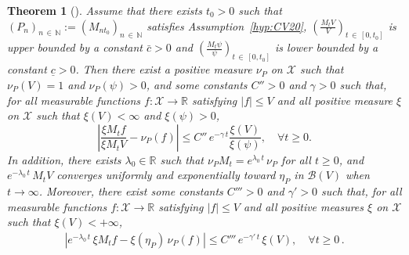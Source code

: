 \documentclass[10pt]{amsart}
\newtheorem{theo}{Theorem}[section]
\theoremstyle{definition}\newtheorem{defi}[theo]{Definition}\newtheorem{rema}[theo]{Remark}\newtheorem{exam}[theo]{Example}\newtheorem{exem}[theo]{Example}\newtheorem{nota}[theo]{Notation}
\newcommand{\RR}{\mathbb{R}}
\newcommand{\NN}{\mathbb{N}}
\newcommand{\clX}{\mathcal{X}}
\newcommand{\clB}{\mathcal{B}}
\newcommand{\1}{\mathbf{1}}
\let\oldforall\forall
\renewcommand*{\forall}{\mathrel{\oldforall}}
\begin{document}
\begin{theo}[{\cite[Corollary~2.4]{CV20}}]\label{th:CV20}
Assume that there exists $t_0>0$ such that $(P_{n})_{n\,\in\,\NN}:=(M_{nt_0})_{n\,\in\,\NN}$ satisfies Assumption~\ref{hyp:CV20}, $(\frac{M_tV}{V})_{t\,\in\,[0,t_0]}$ is upper bounded by a constant $\bar c>0$ and $(\frac{M_t\psi}{\psi})_{t\,\in\,[0,t_0]}$ is lower bounded by a constant $\underline{c}>0$. Then there exist a positive measure $\nu_P$ on $\clX$ such that $\nu_P(V)=1$ and $\nu_P(\psi)>0$, and some constants $C''>0$ and $\gamma>0$ such that, for all measurable functions $f:\clX\to \RR$ satisfying $|f|\leq V$ and all positive measure $\xi$ on $\clX$ such that $\xi(V)<\infty$ and $\xi(\psi)>0$,
\[
\left| \frac{\xi M_t f}{\xi M_t V} -\nu_P(f)\right| \leq C''\,e^{-\gamma\,t} \frac{\xi(V)}{\xi(\psi)}, \quad \forall t\geq 0.
\]
In addition, there exists $\lambda_0\in \RR$ such that $\nu_P M_t = e^{\lambda_0\,t}\,\nu_P$ for all $t\geq 0$, and $e^{-\lambda_0\,t}\,M_t V$ converges uniformly and exponentially toward $\eta_P$ in $\clB(V)$ when $t\to \infty$. Moreover, there exist some constants $C'''>0$ and $\gamma'>0$ such that, for all measurable functions $f:\clX\to \RR$ satisfying $|f|\leq V$ and all positive measures $\xi$ on $\clX$ such that $\xi(V)<+\infty$,
\begin{align}\label{eq:cor2.4.CV20.eta}
\left| e^{-\lambda_0\,t}\,\xi M_t f-\xi(\eta_P)\,\nu_P(f) \right| \leq C'''\, e^{-\gamma'\,t}\, \xi(V), \quad \forall t\geq 0\,.
\end{align}
\end{theo}


\end{document}
